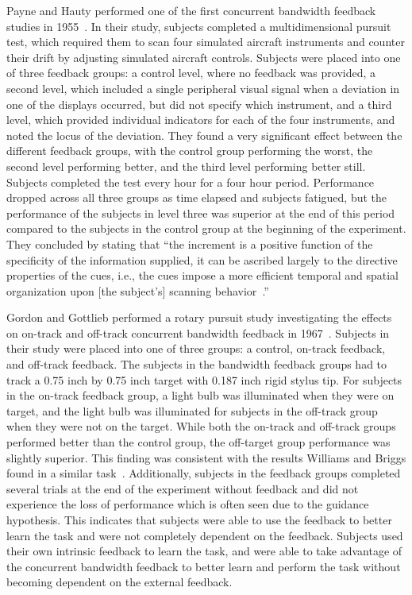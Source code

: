 Payne and Hauty performed one of the first concurrent bandwidth feedback studies in 1955~\citep{payne_effect_1955}.
In their study, subjects completed a multidimensional pursuit test, which required them to scan four simulated aircraft instruments and counter their drift by adjusting simulated aircraft controls.
Subjects were placed into one of three feedback groups: a control level, where no feedback was provided, a second level, which included a single peripheral visual signal when a deviation in one of the displays occurred, but did not specify which instrument, and a third level, which provided individual indicators for each of the four instruments, and noted the locus of the deviation.
They found a very significant effect between the different feedback groups, with the control group performing the worst, the second level performing better, and the third level performing better still.
Subjects completed the test every hour for a four hour period.
Performance dropped across all three groups as time elapsed and subjects fatigued, but the performance of the subjects in level three was superior at the end of this period compared to the subjects in the control group at the beginning of the experiment.
They concluded by stating that ``the increment is a positive function of the specificity of the information supplied, it can be ascribed largely to the directive properties of the cues, i.e., the cues impose a more efficient temporal and spatial organization upon [the subject's] scanning behavior~\citep{payne_effect_1955}.''

Gordon and Gottlieb performed a rotary pursuit study investigating the effects on on-track and off-track concurrent bandwidth feedback in 1967~\citep{gordon_effect_1967}.
Subjects in their study were placed into one of three groups: a control, on-track feedback, and off-track feedback.
The subjects in the bandwidth feedback groups had to track a 0.75 inch by 0.75 inch target with 0.187 inch rigid stylus tip.
For subjects in the on-track feedback group, a light bulb was illuminated when they were on target, and the light bulb was illuminated for subjects in the off-track group when they were not on the target.
While both the on-track and off-track groups performed better than the control group, the off-target group performance was slightly superior.
This finding was consistent with the results Williams and Briggs found in a similar task~\citep{williams_-target_1962}.
Additionally, subjects in the feedback groups completed several trials at the end of the experiment without feedback and did not experience the loss of performance which is often seen due to the guidance hypothesis.
This indicates that subjects were able to use the feedback to better learn the task and were not completely dependent on the feedback.
Subjects used their own intrinsic feedback to learn the task, and were able to take advantage of the concurrent bandwidth feedback to better learn and perform the task without becoming dependent on the external feedback.

